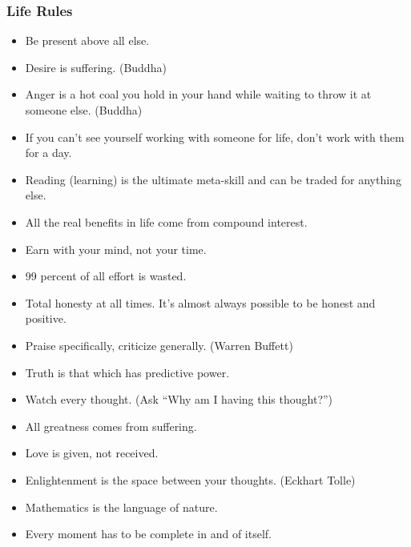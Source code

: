 \begin{frame}[fragile]\frametitle{Life Rules}

	\begin{itemize}
\item Be present above all else. 
\item Desire is suffering. (Buddha) 
\item Anger is a hot coal you hold in your hand while waiting to throw it at someone else. (Buddha) 
\item If you can't see yourself working with someone for life, don't work with them for a day. 
\item Reading (learning) is the ultimate meta-skill and can be traded for anything else. 
\item All the real benefits in life come from compound interest. 
\item Earn with your mind, not your time. 
\item 99 percent of all effort is wasted. 
\item Total honesty at all times. It's almost always possible to be honest and positive. 
\item Praise specifically, criticize generally. (Warren Buffett) 
\item Truth is that which has predictive power. 
\item Watch every thought. (Ask ``Why am I having this thought?'') 
\item All greatness comes from suffering. 
\item Love is given, not received. 
\item Enlightenment is the space between your thoughts. (Eckhart Tolle) 
\item Mathematics is the language of nature. 
\item Every moment has to be complete in and of itself.
	\end{itemize}

\end{frame}

